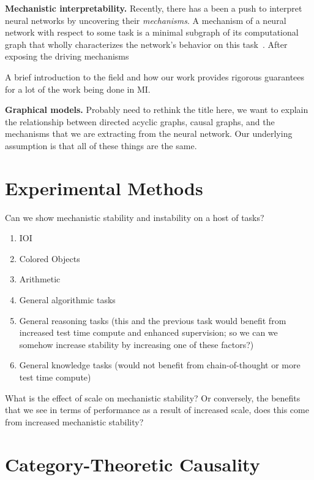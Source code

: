 \documentclass[10pt]{article}
\begin{document}
\textbf{Mechanistic interpretability.} Recently, there has a been a push to interpret
neural networks by uncovering their
\textit{mechanisms}. A mechanism of a neural network with respect to some task
is a minimal subgraph of its computational graph that wholly characterizes the
network's behavior on this task~\citep{wang_interpretability_2022}. After exposing
the driving mechanisms 

A brief introduction to the field
and how our work provides rigorous guarantees for a lot of the work being
done in MI.

\textbf{Graphical models.} Probably need to rethink the title here, we want
to explain the relationship between directed acyclic graphs, causal graphs,
and the mechanisms that we are extracting from the neural network. Our
underlying assumption is that all of these things are the same.

\section{Experimental Methods}
Can we show mechanistic stability and instability on a host of tasks?
\begin{enumerate}
\item IOI
\item Colored Objects
\item Arithmetic
\item General algorithmic tasks
\item General reasoning tasks (this and the previous task would benefit
from increased test time compute and enhanced supervision; so we can we
somehow increase stability by increasing one of these factors?)
\item General knowledge tasks (would not benefit from chain-of-thought or more
test time compute)
\end{enumerate}
What is the effect of scale on mechanistic stability? Or conversely, the benefits
that we see in terms of performance as a result of increased scale, does this
come from increased mechanistic stability?




\newpage
\section{Category-Theoretic Causality}
\end{document}
